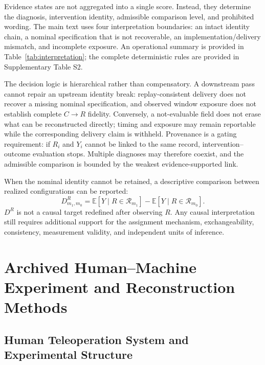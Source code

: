 \documentclass[journal]{IEEEtran}
\begin{document}
Evidence states are not aggregated into a single score. Instead, they
determine the diagnosis, intervention identity, admissible comparison level,
and prohibited wording. The main text uses four interpretation boundaries: an
intact identity chain, a nominal specification that is not recoverable, an
implementation/delivery mismatch, and incomplete exposure. An operational
summary is provided in Table~\ref{tab:interpretation}; the complete
deterministic rules are provided in Supplementary Table S2.

The decision logic is hierarchical rather than compensatory. A downstream
pass cannot repair an upstream identity break: replay-consistent delivery
does not recover a missing nominal specification, and observed window
exposure does not establish complete $C\rightarrow R$ fidelity. Conversely, a
not-evaluable field does not erase what can be reconstructed directly; timing
and exposure may remain reportable while the corresponding delivery claim is
withheld. Provenance is a gating requirement: if $R_i$ and $Y_i$ cannot be
linked to the same record, intervention--outcome evaluation stops. Multiple
diagnoses may therefore coexist, and the admissible comparison is bounded by
the weakest evidence-supported link.

When the nominal identity cannot be retained, a descriptive comparison
between realized configurations can be reported:
\begin{equation}
D^R_{m_1,m_0}=\mathbb{E}[Y\mid R\in\mathcal{R}_{m_1}]
-\mathbb{E}[Y\mid R\in\mathcal{R}_{m_0}].
\label{eq:realized_comparison}
\end{equation}
$D^R$ is not a causal target redefined after observing $R$. Any causal
interpretation still requires additional support for the assignment
mechanism, exchangeability, consistency, measurement validity, and
independent units of inference.

\section{Archived Human--Machine Experiment and Reconstruction Methods}

\subsection{Human Teleoperation System and Experimental Structure}
\end{document}
